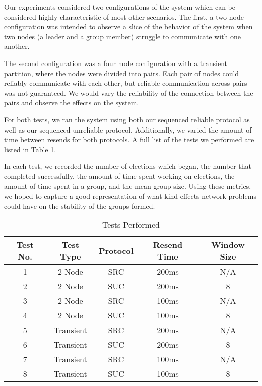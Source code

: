Our experiments considered two configurations of the system which can be considered highly characteristic of most other scenarios. The first, a two node configuration was intended to observe a slice of the behavior of the system when two nodes (a leader and a group member) struggle to communicate with one another.

The second configuration was a four node configuration with a transient partition, where the nodes were divided into pairs. Each pair of nodes could reliably communicate with each other, but reliable communication across pairs was not guaranteed. We would vary the reliability of the connection between the pairs and observe the effects on the system.

For both tests, we ran the system using both our sequenced reliable protocol as well as our sequenced unreliable protocol. Additionally, we varied the amount of time between resends for both protocols. A full list of the tests we performed are listed in Table \ref{TableTests}.

In each test, we recorded the number of elections which began, the number that completed successfully, the amount of time spent working on elections, the amount of time spent in a group, and the mean group size. Using these metrics, we hoped to capture a good representation of what kind effects network problems could have on the stability of the groups formed.

\begin{table}[!t]
\renewcommand{\arraystretch}{1.3}
\caption{Tests Performed}
\label{TableTests}
\centering
\begin{tabular}{c c c c c}
\hline
Test No. & Test Type & Protocol & Resend Time & Window Size \\ \hline \hline
1        & 2 Node    & SRC      & 200ms       & N/A \\ \hline
2        & 2 Node    & SUC      & 200ms       & 8 \\ \hline
3        & 2 Node    & SRC      & 100ms       & N/A \\ \hline
4        & 2 Node    & SUC      & 100ms       & 8 \\ \hline
5        & Transient & SRC      & 200ms       & N/A \\ \hline
6        & Transient & SUC      & 200ms       & 8 \\ \hline
7        & Transient & SRC      & 100ms       & N/A \\ \hline
8       & Transient & SUC      & 100ms       & 8 \\ \hline
\end{tabular}
\end{table}
